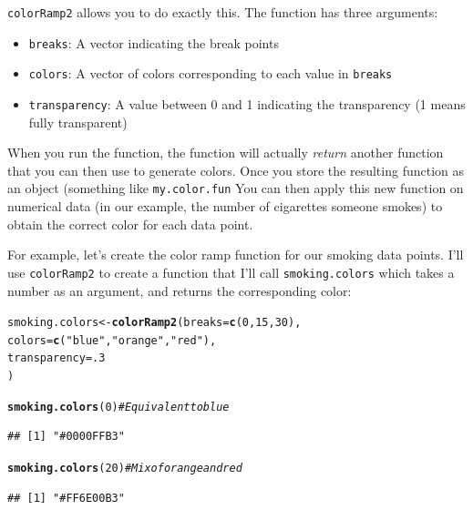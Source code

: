 \documentclass{tufte-book}\usepackage[]{graphicx}\usepackage[]{color}
\makeatletter
\newcommand{\hlnum}[1]{\textcolor[rgb]{0.686,0.059,0.569}{#1}}%
\newcommand{\hlstr}[1]{\textcolor[rgb]{0.192,0.494,0.8}{#1}}%
\newcommand{\hlcom}[1]{\textcolor[rgb]{0.678,0.584,0.686}{\textit{#1}}}%
\newcommand{\hlstd}[1]{\textcolor[rgb]{0.345,0.345,0.345}{#1}}%
\newcommand{\hlkwb}[1]{\textcolor[rgb]{0.69,0.353,0.396}{#1}}%
\newcommand{\hlkwc}[1]{\textcolor[rgb]{0.333,0.667,0.333}{#1}}%
\newcommand{\hlkwd}[1]{\textcolor[rgb]{0.737,0.353,0.396}{\textbf{#1}}}%
\newenvironment{kframe}{%
 \def\at@end@of@kframe{}%
 \ifinner\ifhmode%
  \def\at@end@of@kframe{\end{minipage}}%
  \begin{minipage}{\columnwidth}%
 \fi\fi%
 \def\FrameCommand##1{\hskip\@totalleftmargin \hskip-\fboxsep
 \colorbox{shadecolor}{##1}\hskip-\fboxsep
     \hskip-\linewidth \hskip-\@totalleftmargin \hskip\columnwidth}%
 \MakeFramed {\advance\hsize-\width
   \@totalleftmargin\z@ \linewidth\hsize
   \@setminipage}}%
 {\par\unskip\endMakeFramed%
 \at@end@of@kframe}
\newenvironment{knitrout}{}{} %
\makeatother
\begin{document}
\begin{footnotesize}
\texttt{colorRamp2} allows you to do exactly this. The function has three arguments:

\begin{itemize}
  \item \texttt{breaks}: A vector indicating the break points
  \item \texttt{colors}: A vector of colors corresponding to each value in \texttt{breaks}
  \item \texttt{transparency}: A value between 0 and 1 indicating the transparency (1 means fully transparent)
\end{itemize}

When you run the function, the function will actually \textit{return} another function that you can then use to generate colors. Once you store the resulting function as an object (something like \texttt{my.color.fun} You can then apply this new function on numerical data (in our example, the number of cigarettes someone smokes) to obtain the correct color for each data point. 

For example, let's create the color ramp function for our smoking data points. I'll use \texttt{colorRamp2} to create a function that I'll call \texttt{smoking.colors} which takes a number as an argument, and returns the corresponding color:

\begin{knitrout}
\color{fgcolor}\begin{kframe}
\begin{alltt}
\hlstd{smoking.colors} \hlkwb{<-} \hlkwd{colorRamp2}\hlstd{(}\hlkwc{breaks} \hlstd{=} \hlkwd{c}\hlstd{(}\hlnum{0}\hlstd{,} \hlnum{15}\hlstd{,} \hlnum{30}\hlstd{),}
                  \hlkwc{colors} \hlstd{=} \hlkwd{c}\hlstd{(}\hlstr{"blue"}\hlstd{,} \hlstr{"orange"}\hlstd{,} \hlstr{"red"}\hlstd{),}
                  \hlkwc{transparency} \hlstd{=} \hlnum{.3}
                  \hlstd{)}

\hlkwd{smoking.colors}\hlstd{(}\hlnum{0}\hlstd{)} \hlcom{# Equivalent to blue}
\end{alltt}
\begin{verbatim}
## [1] "#0000FFB3"
\end{verbatim}
\begin{alltt}
\hlkwd{smoking.colors}\hlstd{(}\hlnum{20}\hlstd{)} \hlcom{# Mix of orange and red}
\end{alltt}
\begin{verbatim}
## [1] "#FF6E00B3"
\end{verbatim}
\end{kframe}
\end{knitrout}


\end{footnotesize}
\end{document}
